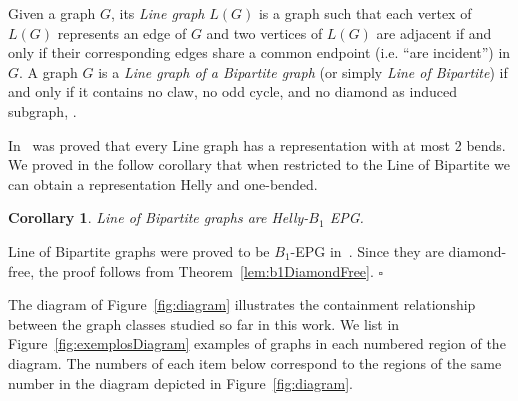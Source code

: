 \documentclass[9pt]{entcs}
\newtheorem{coro}[thm]{Corollary}%
\begin{document}
Given a graph $G$, its \textit{Line graph} $L(G)$ is a graph such that each vertex of $L(G)$ represents an edge of $G$ and
  two vertices of $L(G)$ are adjacent if and only if their corresponding edges share a common endpoint (i.e. ``are incident'') in $G$.  
A graph $G$ is a \textit{Line graph of a Bipartite graph} (or simply \textit{Line of Bipartite}) if and only if it
contains no claw, no odd cycle, and no diamond as induced subgraph, \cite{harary1974line}.

In~\cite{daniel2014b} was proved that every Line graph has a representation with at most 2 bends. We proved in the follow corollary that when restricted to the Line of Bipartite we can obtain a representation Helly and one-bended.

\begin{coro}\label{coro:lineOfBipartite}
 Line of Bipartite graphs are Helly-$B_1$ EPG. 
\end{coro}

\begin{pf}
Line of Bipartite graphs were proved to be $B_1$-EPG in~\cite{golumbic2018edge}. Since they are diamond-free, the proof follows from Theorem~\ref{lem:b1DiamondFree}.
$\square$
\end{pf}

The diagram of Figure~\ref{fig:diagram}
illustrates the containment relationship between the graph classes  studied so far in this work. 
We list in Figure~\ref{fig:exemplosDiagram} examples of graphs in each numbered region of the diagram. The numbers of each item below correspond to the regions of the same number in the diagram depicted in Figure~\ref{fig:diagram}.

\end{document}
